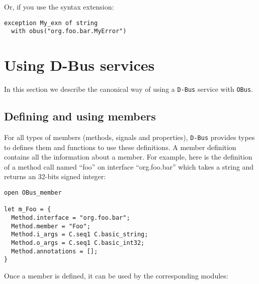 \documentclass{article}
\newcommand{\obus}{\texttt{OBus}\xspace}
\newcommand{\dbus}{\texttt{D-Bus}\xspace}
\begin{document}
  Or, if you use the syntax extension:

\lstset{language=[Objective]Caml}
\begin{lstlisting}
exception My_exn of string
  with obus("org.foo.bar.MyError")
\end{lstlisting}

\section{Using D-Bus services}

In this section we describe the canonical way of using a \dbus service
with \obus.

\subsection{Defining and using members}

For all types of members (methods, signals and properties), \dbus
provides types to defines them and functions to use these
definitions. A member definition contains all the information about a
member. For example, here is the definition of a method call named
``foo'' on interface ``org.foo.bar'' which takes a string and returns
an 32-bits signed integer:

\lstset{language=[Objective]Caml}
\begin{lstlisting}
open OBus_member

let m_Foo = {
  Method.interface = "org.foo.bar";
  Method.member = "Foo";
  Method.i_args = C.seq1 C.basic_string;
  Method.o_args = C.seq1 C.basic_int32;
  Method.annotations = [];
}
\end{lstlisting}

Once a member is defined, it can be used by the corresponding modules:
\end{document}

